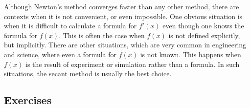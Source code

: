 Although Newton's method converges faster than any other
method, there are contexts when it is not convenient,
or even impossible. One obvious situation is when it
is difficult to calculate a formula for $f'(x)$
even though one knows the formula for $f(x)$. This is
often the case when $f(x)$ is not defined explicitly,
but implicitly. There are other situations, which are
very common in engineering and science, where even a formula for
$f(x)$ is not known. This happens when $f(x)$
is the result of experiment or simulation rather than
a formula. In such situations, the secant method is usually
the best choice.


\subsection*{Exercises}
